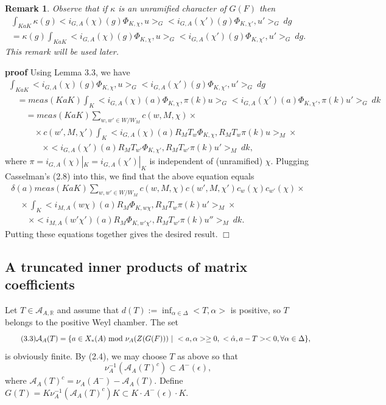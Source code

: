 \documentclass[12pt]{article}
\newtheorem{remark}{Remark}
\newenvironment{pf}[1][proof:]{\par\medskip\noindent\textbf{#1} }{\par\medskip}
\begin{document}
\begin{remark}
Observe that if $\kappa$ is an unramified character of $G(F)$ then
\[
\begin{array}{l}
\int_{KaK}\kappa(g)<i_{G,A}(\chi)(g)\Phi_{K,\chi},u>_G<i_{G,A}(\chi')(g)\Phi_{K,\chi'},u'>_G\ dg\\
=\kappa(g)\int_{KaK}<i_{G,A}(\chi)(g)\Phi_{K,\chi},u>_G<i_{G,A}(\chi')(g)\Phi_{K,\chi'},u'>_G\ dg.
\end{array}
\]
This remark will be used later.
\end{remark}

\begin{pf}[proof]
Using Lemma 3.3, we have
\[
\begin{array}{l}
\int_{KaK}<i_{G,A}(\chi)(g)\Phi_{K,\chi},u>_G<i_{G,A}(\chi')(g)\Phi_{K,\chi'},u'>_G\ dg\\
\quad=meas(KaK)\int_K<i_{G,A}(\chi)(a)\Phi_{K,\chi},\pi(k)u>_G<i_{G,A}(\chi')(a)\Phi_{K,\chi'},\pi(k)u'>_G\ dk\\
\quad\quad=meas(KaK)\sum_{w,w'\in W/W_M}c(w,M,\chi)\times\\
\quad\quad\quad\times c(w',M,\chi')\int_K<i_{G,A}(\chi)(a)R_MT_w\Phi_{K,\chi},R_MT_w\pi(k)u>_M\times\\
\quad\quad\quad\quad\times<i_{G,A}(\chi')(a)R_MT_{w'}\Phi_{K,\chi'},R_MT_{w'}\pi(k)u'>_M\ dk,
\end{array}
\]
where $\pi=i_{G,A}(\chi)|_K=i_{G,A}(\chi')|_K$ is independent of (unramified) $\chi$. Plugging Casselman's (2.8) into this, we find that the above equation equals
\[
\begin{array}{l}
\delta(a)meas(KaK)\sum_{w,w'\in W/W_M}c(w,M,\chi)c(w',M,\chi')c_w(\chi)c_{w'}(\chi)\times\\
\quad\times\int_K<i_{M,A}(w\chi)(a)R_M\Phi_{K,w\chi},R_MT_w\pi(k)u'>_M\times\\
\quad\quad\times<i_{M,A}(w'\chi')(a)R_M\Phi_{K,w'\chi'},R_MT_{w'}\pi(k)u''>_M\ dk.
\end{array}
\]
Putting these equations together gives the desired result. $\Box$
\end{pf}

\subsection{A truncated inner products of matrix coefficients}

Let $T\in\mathcal{A}_{A,\mathbb{R}}$ and assume that $d(T):=\inf_{\alpha\in\Delta}<T,\alpha>$ is positive, so $T$ belongs to the positive Weyl chamber. The set
\begin{equation}\tag{3.3}
\mathcal{A}_A(T)=\{a\in X_*(A)\ {\rm mod}\ \nu_A(Z(G(F)))\ |\ <a,\alpha>\geq0,\ <\hat\alpha,a-T><0,\forall\alpha\in\Delta\},
\end{equation}
is obviously finite. By (2.4), we may choose $T$ as above so that
\[
\nu_A^{-1}(\mathcal{A}_A(T)^c)\subset A^-(\epsilon),
\]
where $\mathcal{A}_A(T)^c=\nu_A(A^-)-\mathcal{A}_A(T)$. Define $G(T)=K\nu_A^{-1}(\mathcal{A}_A(T)^c)K\subset K\cdot A^-(\epsilon)\cdot K$.
\end{document}
